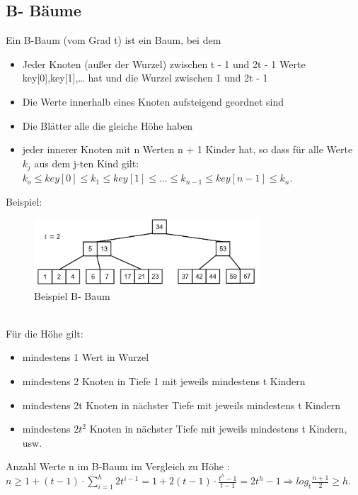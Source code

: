 \documentclass{article}
\begin{document}
        \subsection{B- Bäume}
            Ein B-Baum (vom Grad t) ist ein Baum, bei dem
            \begin{itemize}
                \item Jeder Knoten (außer der Wurzel) zwischen t - 1 und 2t - 1 Werte key[0],key[1],… hat und die Wurzel zwischen 1 und 2t - 1
                \item Die Werte innerhalb eines Knoten aufsteigend geordnet sind
                \item Die Blätter alle die gleiche Höhe haben
                \item jeder innerer Knoten mit n Werten n + 1 Kinder hat, so dass für alle Werte $k_j$ aus dem j-ten Kind gilt: \\$k_o \leq key[0] \leq k_1 \leq key[1] \leq ... \leq k_{n-1} \leq key[n-1] \leq k_n$.
            \end{itemize}
            Beispiel:
            \begin{figure}[ht]
                \centering
                \includegraphics[width=0.75\textwidth]{Bilder/BB.png}
                \caption{Beispiel B- Baum}
                \label{fig:BB}
            \end{figure}\\
            Für die Höhe gilt:
            \begin{itemize}
                \item mindestens 1 Wert in Wurzel
                \item mindestens 2 Knoten in Tiefe 1 mit jeweils mindestens t Kindern
                \item mindestens 2t Knoten in nächster Tiefe mit jeweils mindestens t Kindern
                \item mindestens $2t^2$ Knoten in nächster Tiefe mit jeweils mindestens t Kindern, usw.
            \end{itemize}
            Anzahl Werte n im B-Baum im Vergleich zu Höhe : $n \geq 1+(t-1)\cdot \sum_{i=1}^{h}2t^{i-1}=1+2(t-1)\cdot \frac{t^h-1}{t-1}=2t^h-1 \Rightarrow log_t \frac{n+1}{2} \geq h$.\\
\end{document}
